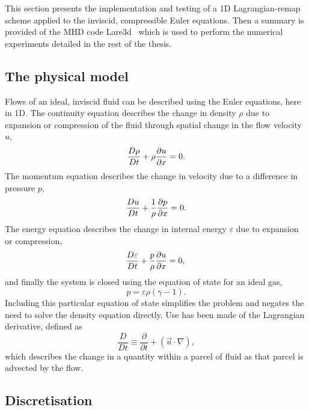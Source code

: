 This section presents the implementation and testing of a 1D Lagrangian-remap scheme applied to the inviscid, compressible Euler equations. Then a summary is provided of the MHD code Lare3d~\cite{arberStaggeredGridLagrangian2001} which is used to perform the numerical experiments detailed in the rest of the thesis. 

\subsection{The physical model}

Flows of an ideal, inviscid fluid can be described using the Euler equations, here in 1D. The continuity equation describes the change in density $\rho$ due to expansion or compression of the fluid through spatial change in the flow velocity $u$,
\begin{equation}
  \frac{D \rho}{Dt} + \rho\frac{\partial u}{\partial x} = 0.\\
  \label{eqn-Lare1d-density}
\end{equation}
The momentum equation describes the change in velocity due to a difference in pressure $p$,
\begin{equation}
  \frac{D u}{Dt} + \frac{1}{\rho}\frac{\partial p}{\partial x} = 0.\\
  \label{eqn-Lare1d-velocity}
\end{equation}
The energy equation describes the change in internal energy $\varepsilon$ due to expansion or compression,
\begin{equation}
  \frac{D \varepsilon}{Dt} + \frac{p}{\rho}\frac{\partial u}{\partial x} = 0,\\
  \label{eqn-Lare1d-energy}
\end{equation}
and finally the system is closed using the equation of state for an ideal gas,
\begin{equation}
  p = \varepsilon\rho(\gamma - 1).
  \label{eqn-Lare1d-equation-of-state}
\end{equation}
Including this particular equation of state simplifies the problem and negates the need to solve the density equation directly. Use has been made of the Lagrangian derivative, defined as
\begin{equation}
  \frac{D }{Dt} \equiv \frac{\partial}{\partial t} + (\vec{u} \cdot \nabla),
\end{equation}
which describes the change in a quantity within a parcel of fluid as that parcel is advected by the flow. 

\subsection{Discretisation} 

